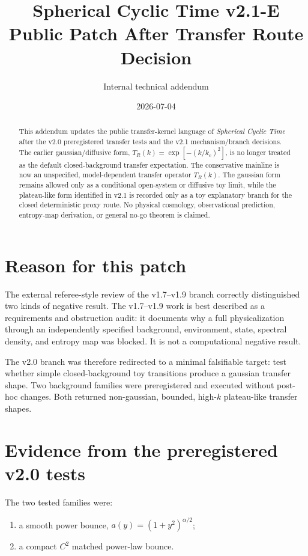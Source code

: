 \documentclass[11pt]{article}
\title{Spherical Cyclic Time v2.1-E\\Public Patch After Transfer Route Decision}
\author{Internal technical addendum}
\date{2026-07-04}
\begin{document}
\maketitle

\begin{abstract}
This addendum updates the public transfer-kernel language of \emph{Spherical Cyclic Time} after the v2.0 preregistered transfer tests and the v2.1 mechanism/branch decisions. The earlier gaussian/diffusive form, $T_R(k)=\exp[-(k/k_c)^2]$, is no longer treated as the default closed-background transfer expectation. The conservative mainline is now an unspecified, model-dependent transfer operator $T_R(k)$. The gaussian form remains allowed only as a conditional open-system or diffusive toy limit, while the plateau-like form identified in v2.1 is recorded only as a toy explanatory branch for the closed deterministic proxy route. No physical cosmology, observational prediction, entropy-map derivation, or general no-go theorem is claimed.
\end{abstract}

\section{Reason for this patch}

The external referee-style review of the v1.7--v1.9 branch correctly distinguished two kinds of negative result. The v1.7--v1.9 work is best described as a requirements and obstruction audit: it documents why a full physicalization through an independently specified background, environment, state, spectral density, and entropy map was blocked. It is not a computational negative result.

The v2.0 branch was therefore redirected to a minimal falsifiable target: test whether simple closed-background toy transitions produce a gaussian transfer shape. Two background families were preregistered and executed without post-hoc changes. Both returned non-gaussian, bounded, high-$k$ plateau-like transfer shapes.

\section{Evidence from the preregistered v2.0 tests}

The two tested families were:
\begin{enumerate}
\item a smooth power bounce, $a(y)=(1+y^2)^{\alpha/2}$;
\item a compact $C^2$ matched power-law bounce.
\end{enumerate}
\end{document}
